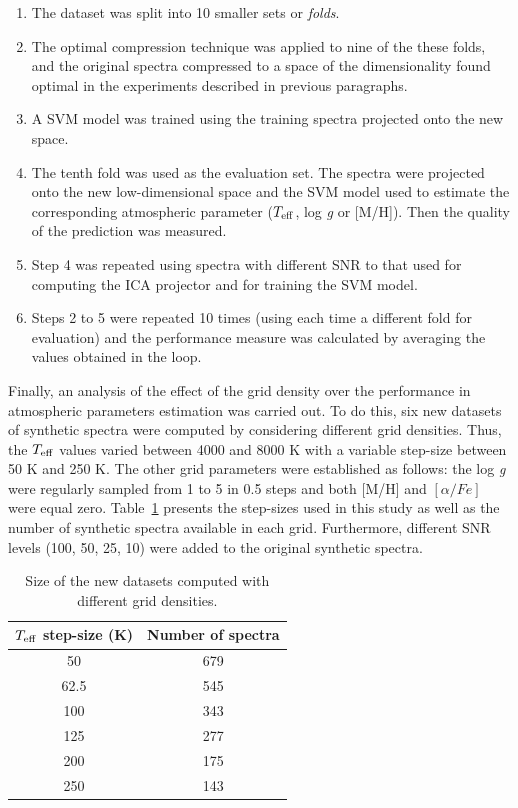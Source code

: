 \documentclass[a4paper,fleqn,usenatbib]{mnras}
\begin{document}
\begin{enumerate}
\item The dataset was split into 10 smaller sets or \textit{folds}.
\item The optimal compression technique was applied to nine of
  the these folds, and the original spectra compressed to a space
  of the dimensionality found optimal in the experiments described in
  previous paragraphs.
\item A SVM model was trained using the training spectra projected
  onto the new space.
\item The tenth fold was used as the evaluation set. The spectra
  were projected onto the new low-dimensional space and the
    SVM model used to estimate the corresponding  atmospheric parameter 
    ($T_{\rm eff}$, log \textit{g} or [M/H]). Then the
  quality of the prediction was measured.
\item Step 4 was repeated using spectra with different SNR to that
  used for computing the ICA projector and for training the SVM model.
\item Steps 2 to 5 were repeated 10 times (using each time a
  different fold for evaluation) and the performance measure was
  calculated by averaging the values obtained in the loop.
\end{enumerate}

Finally, an analysis of the effect of the grid density over the 
performance in atmospheric parameters estimation was carried out. 
To do this, six new datasets of synthetic spectra were computed
by considering different grid densities. Thus, the $T_{\rm eff}$ 
values varied between 4000 and 8000 K with a variable step-size 
between 50 K and 250 K. The other grid parameters were established 
as follows: the log \textit{g} were regularly sampled from 1 to 5 
in 0.5 steps and both [M/H] and $\left[ \alpha/Fe \right]$ were 
equal zero. Table~\ref{tab:grid} presents the step-sizes used in this 
study as well as the number of synthetic spectra available in each grid.
Furthermore, different SNR levels (100, 50, 25, 10) were added to
the original synthetic spectra.

\begin{table}
\centering
\caption{Size of the new datasets computed with different grid densities.}
\label{tab:grid}
\begin{tabular}{c c}
\hline
\textbf{$T_{\rm eff}$ step-size (K)} & \textbf{Number of spectra} \\
\hline
50 & 679 \\
62.5 & 545 \\
100 & 343 \\
125 & 277 \\
200 & 175\\
250 & 143\\
\hline
\end{tabular}
\end{table}
\end{document}
